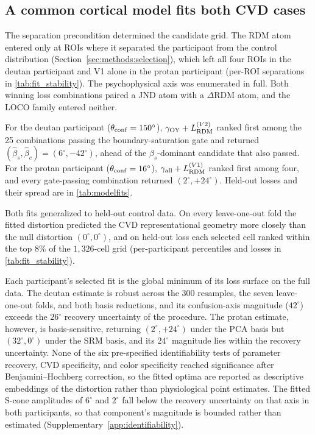 \subsection{A common cortical model fits both CVD cases}
\label{sec:results:twocomp}
\label{sec:results:rc_insufficient}

The separation precondition determined the candidate grid. The RDM atom entered only at ROIs where it separated the participant from the control distribution (Section~\ref{sec:methods:selection}), which left all four ROIs in the deutan participant and V1 alone in the protan participant (per-ROI separations in \cref{tab:fit_stability}). The psychophysical axis was enumerated in full. Both winning loss combinations paired a JND atom with a $\Delta$RDM atom, and the LOCO family entered neither.

For the deutan participant ($\theta_{\rm conf} = 150^\circ$), $\gamma_{\rm OY} + L_{\rm RDM}^{(V2)}$ ranked first among the 25 combinations passing the boundary-saturation gate and returned $(\hat\beta_s, \hat\beta_c) = (6^\circ, -42^\circ)$, ahead of the $\beta_s$-dominant candidate that also passed. For the protan participant ($\theta_{\rm conf} = 16^\circ$), $\gamma_{\rm all} + L_{\rm RDM}^{(V1)}$ ranked first among four, and every gate-passing combination returned $(2^\circ, +24^\circ)$. Held-out losses and their spread are in \cref{tab:modelfits}.

Both fits generalized to held-out control data. On every leave-one-out fold the fitted distortion predicted the CVD representational geometry more closely than the null distortion $(0^\circ, 0^\circ)$, and on held-out loss each selected cell ranked within the top $8\%$ of the $1{,}326$-cell grid (per-participant percentiles and losses in \cref{tab:fit_stability}).

Each participant's selected fit is the global minimum of its loss surface on the full data. The deutan estimate is robust across the 300 resamples, the seven leave-one-out folds, and both basis reductions, and its confusion-axis magnitude ($42^\circ$) exceeds the $26^\circ$ recovery uncertainty of the procedure. The protan estimate, however, is basis-sensitive, returning $(2^\circ, +24^\circ)$ under the PCA basis but $(32^\circ, 0^\circ)$ under the SRM basis, and its $24^\circ$ magnitude lies within the recovery uncertainty. None of the six pre-specified identifiability tests of parameter recovery, CVD specificity, and color specificity reached significance after Benjamini--Hochberg correction, so the fitted optima are reported as descriptive embeddings of the distortion rather than physiological point estimates. The fitted S-cone amplitudes of $6^\circ$ and $2^\circ$ fall below the recovery uncertainty on that axis in both participants, so that component's magnitude is bounded rather than estimated (Supplementary~\cref{app:identifiability}).


